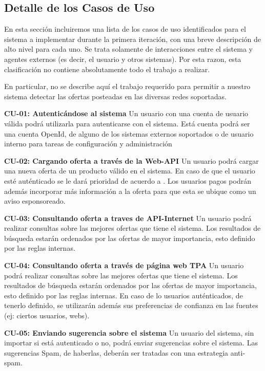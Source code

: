 \subsection*{Detalle de los Casos de Uso}

En esta secci\'on incluiremos una lista de los casos de uso identificados para el sistema a implementar durante la primera iteraci\'on, con una breve descripci\'on de alto nivel para cada uno. Se trata solamente de interacciones entre el sistema y agentes externos (es decir, el usuario y otros sistemas). Por esta razon, esta clasificaci\'on no contiene absolutamente todo el trabajo a realizar.  

En particular, no se describe aqu\'i el trabajo requerido para permitir a nuestro sistema detectar las ofertas posteadas en las diversas redes soportadas. 

\textbf{CU-01: Autentic\'andose al sistema} Un usuario con una cuenta de usuario v\'alida podr\'a utilizarla para autenticarse con el sistema. Est\'a cuenta podr\'a ser una cuenta OpenId, de alguno de los sistemas externos soportados o de usuario interno para tareas de configuraci\'on y administraci\'on

\textbf{CU-02: Cargando oferta a trav\'es de la Web-API} Un usuario podr\'a cargar una nueva oferta de un producto v\'alido en el sistema. En caso de que el usuario est\'e aut\'enticado se le dar\'a prioridad de acuerdo a . Los usuarios pagos podr\'an adem\'as incorporar m\'as informaci\'on a la oferta para que esta se ubique como un aviso esponsoreado.

\textbf{CU-03: Consultando oferta a traves de API-Internet} Un usuario podr\'a realizar consultas sobre las mejores ofertas que tiene el sistema. Los resultados de b\'usqueda estar\'an ordenados por las ofertas de mayor importancia, esto definido por las reglas internas.

\textbf{CU-04: Consultando oferta a trav\'es de p\'agina web TPA} Un usuario podr\'a realizar consultas sobre las mejores ofertas que tiene el sistema. Los resultados de b\'usqueda estar\'an ordenados por las ofertas de mayor importancia, esto definido por las reglas internas. En caso de lo usuarios aut\'enticados, de tenerlo definido, se utilizar\'an adem\'as sus preferencias de confianza en las fuentes (ej: ciertos usuarios, webs).

\textbf{CU-05: Enviando sugerencia sobre el sistema} Un usuario del sistema, sin importar si est\'a autenticado o no, podr\'a enviar sugerencias sobre el sistema. Las sugerencias Spam, de haberlas, deber\'an ser tratadas con una estrategia anti-spam.
